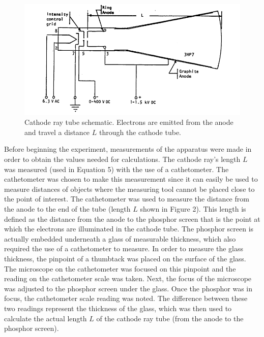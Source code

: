 \documentclass[%
 aip,
 amsmath,amssymb,
 reprint,%
floatfix,
]{revtex4-1}
\begin{document}
	\begin{figure}[H]
		\centering
		\includegraphics[scale=0.5]{cathoderaytube.png}
		\caption{Cathode ray tube schematic. Electrons are emitted from the anode and travel a distance $L$ through the cathode tube.}
	\end{figure}
Before beginning the experiment, measurements of the apparatus were made in order to obtain the values needed for calculations. The cathode ray's length $L$ was measured (used in Equation 5) with the use of a cathetometer. The cathetometer was chosen to make this measurement since it can easily be used to measure distances of objects where the measuring tool cannot be placed close to the point of interest. The cathetometer was used to measure the distance from the anode to the end of the tube (length $L$ shown in Figure 2). This length is defined as the distance from the anode to the phosphor screen that is the point at which the electrons are illuminated in the cathode tube. The phosphor screen is actually embedded underneath a glass of measurable thickness, which also required the use of a cathetometer to measure. In order to measure the glass thickness, the pinpoint of a thumbtack was placed on the surface of the glass. The microscope on the cathetometer was focused on this pinpoint and the reading on the cathetometer scale was taken. Next, the focus of the microscope was adjusted to the phosphor screen under the glass. Once the phosphor was in focus, the cathetometer scale reading was noted. The difference between these two readings represent the thickness of the glass, which was then used to calculate the actual length $L$ of the cathode ray tube (from the anode to the phosphor screen).
\end{document}
